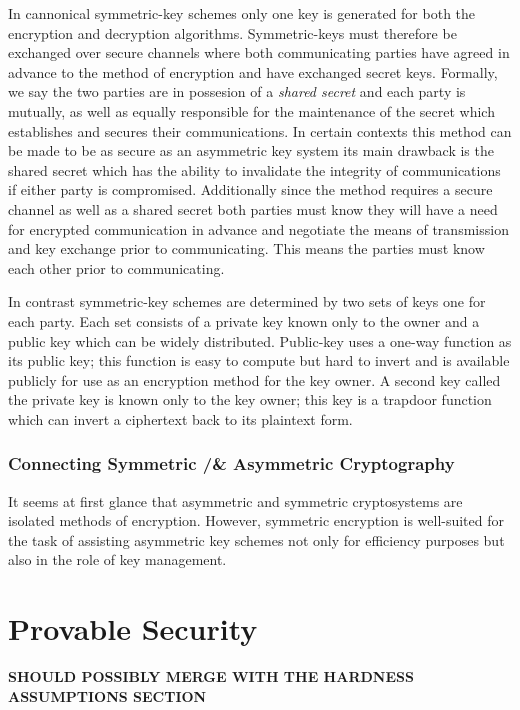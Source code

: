 In cannonical symmetric-key schemes only one key is generated for both the encryption and decryption algorithms. Symmetric-keys must therefore be exchanged over secure channels where both communicating parties have agreed in advance to the method of encryption and have exchanged secret keys. 
\newline
Formally, we say the two parties are in possesion of a \textit{shared secret} and each party is mutually, as well as equally responsible for the maintenance of the secret which establishes and secures their communications. 
In certain contexts this method can be made to be as secure as an asymmetric key system its main drawback is the shared secret which has the ability to invalidate the integrity of communications if either party is compromised.
\newline
Additionally since the method requires a secure channel as well as a shared secret both parties must know they will have a need for encrypted communication in advance and negotiate the means of transmission and key exchange prior to communicating. This means the parties must know each other prior to communicating. 

In contrast symmetric-key schemes are determined by two sets of keys one for each party. Each set consists of a private key known only to the owner and a public key which can be widely distributed.
Public-key uses a one-way function as its public key; this function is easy to compute but hard to invert and is available publicly for use as an encryption method for the key owner. A second key called the private key is known only to the key owner; this key is a trapdoor function which can invert a ciphertext back to its plaintext form.
 
\subsubsection{Connecting Symmetric /& Asymmetric Cryptography}
It seems at first glance that asymmetric and symmetric cryptosystems are isolated methods of encryption. However, symmetric encryption is well-suited for the task of assisting asymmetric key schemes not only for efficiency purposes but also in the role of key management. 

\section{Provable Security} 

\textbf{SHOULD POSSIBLY MERGE WITH THE HARDNESS ASSUMPTIONS SECTION} 

